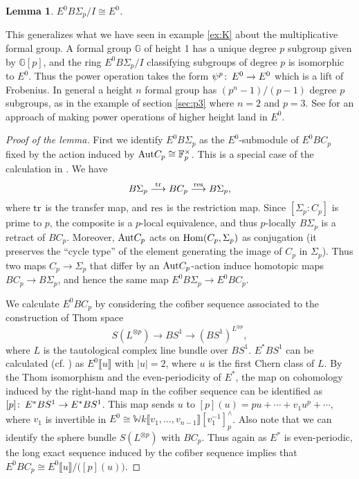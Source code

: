 \documentclass{gtpart}
\newtheorem{lem}[thm]{Lemma}
\theoremstyle{definition}
\theoremstyle{remark}
\def\co{\colon\thinspace}
\newcommand{\mb}[1]{\mathbb{#1}}
\newcommand{\Hom}{\ensuremath{{\rm Hom}}}
\begin{document}
\begin{lem}
\label{lem:cong}
$E^0 B\Sigma_p/I \cong E^0$.
\end{lem}
This generalizes what we have seen in 
example \ref{ex:K} about the multiplicative formal group.  A formal group 
$\mb G$ of height 1 has a unique degree $p$ subgroup given by 
${\mb G}[p]$, and the ring $E^0 B\Sigma_p/I$ classifying subgroups of 
degree $p$ is isomorphic to $E^0$.  Thus the power operation takes the 
form $\psi^p\co E^0 \to E^0$ which is a lift of Frobenius.  In general a 
height $n$ formal group has $(p^n-1)/(p-1)$ degree $p$ subgroups, as in 
the example of section \ref{sec:p3} where $n=2$ and $p=3$.  See \cite[section 3.5]{Andu} for an approach of making power operations of higher height land in $E^0$.  
\begin{proof}[Proof of the lemma]
First we identify $E^0 B\Sigma_p$ as the $E^0$-submodule of $E^0 BC_p$ fixed by 
the action induced by ${\rm Aut} C_p \cong {\mb F}_p^\times$. This is a 
special case of the calculation in \cite[section 12]{lpo}.  We have
\[
 B\Sigma_p \stackrel{\rm tr}{\longrightarrow} BC_p 
 \stackrel{\rm res}{\longrightarrow} B\Sigma_p,
\]
where $\rm tr$ is the transfer map, and $\rm res$ is the restriction map.  
Since $[\Sigma_p : C_p]$ is prime to $p$, the composite is a $p$-local 
equivalence, and thus $p$-locally $B\Sigma_p$ is a retract of $BC_p$.  
Moreover, ${\rm Aut} C_p$ acts on $\Hom (C_p,\Sigma_p)$ as conjugation (it preserves the ``cycle type'' of the element generating the image of $C_p$ in $\Sigma_p$).  
Thus two maps $C_p \to \Sigma_p$ that differ by an ${\rm Aut} C_p$-action induce homotopic maps $BC_p \to B\Sigma_p$, and hence the same map 
$E^0 B\Sigma_p \to E^0 BC_p$.  

We calculate $E^0 BC_p$ by considering 
the cofiber sequence associated to the construction of Thom space 
\[
 S(L^{\otimes p}) \to BS^1 \to (BS^1)^{L^{\otimes p}}, 
\]
where $L$ is the tautological complex line bundle over $BS^1$.  
$E^* BS^1$ can be calculated (cf. \cite[section 1]{coctalos}) as $E^0 \llbracket u \rrbracket$ with $|u| = 2$, 
where $u$ is the first Chern class of $L$.  By the Thom isomorphism and the even-periodicity of $E^*$, 
the map on cohomology induced by the right-hand map in the cofiber sequence can be identified as 
$[p]\co E^* BS^1 \to E^* BS^1$.  This map sends $u$ to $[p](u) = 
p u + \cdots + v_1 u^p + \cdots$, where $v_1$ is invertible in $E^0 \cong 
{\mb W}k \llbracket v_1,...,v_{n-1} \rrbracket [v_1^{-1}]_p^\wedge$.  
Also note that we can identify the sphere bundle $S(L^{\otimes p})$ with $BC_p$.  
Thus again as $E^*$ is even-periodic, the long exact sequence induced by the cofiber sequence implies that 
$E^0 BC_p \cong 
E^0 \llbracket u \rrbracket / \big([p](u)\big)$.  


\end{proof}
\end{document}
